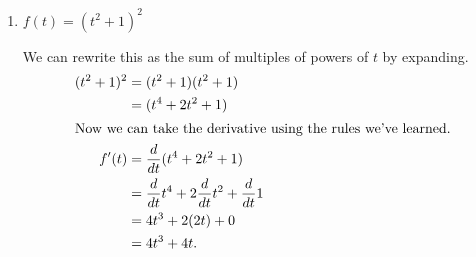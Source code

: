 \documentclass{article}
\begin{document}
\begin{enumerate}[resume]
\begin{enumerate}
  \item
    \begin{problem}[\vfill]
      $f(t) = (t^2 + 1)^2$
    \end{problem}

    \begin{solution}
      We can rewrite this as the sum of multiples of powers of $t$ by expanding.
      \begin{align*}
        (t^2 + 1)^2 &= (t^2 + 1)(t^2 + 1) \\
        &= (t^4 + 2t^2 + 1) \\
        \intertext{Now we can take the derivative using the rules we've learned.}
        f'(t) &= \frac{d}{dt} (t^4 + 2t^2 + 1) \\
        &= \frac{d}{dt} t^4 + 2\frac{d}{dt} t^2 + \frac{d}{dt} 1 \\
        &= 4t^3 + 2(2t) + 0 \\
        &= 4t^3 + 4t.
      \end{align*}
    \end{solution}

  \end{enumerate}

\end{enumerate}
\end{document}
